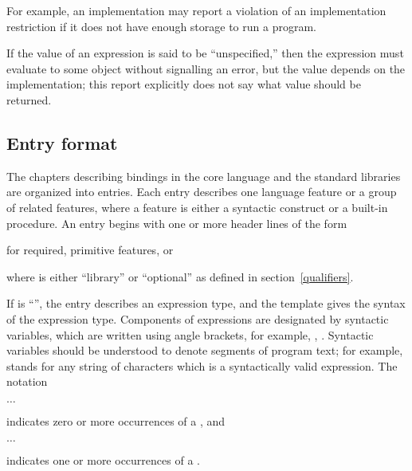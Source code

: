 \vest For example, an implementation may report a violation of an
implementation restriction if it does not have enough storage to run a
program.

\vest If the value of an expression is said to be ``unspecified,'' then
the expression must evaluate to some object without signalling an error,
but the value depends on the implementation; this report explicitly does
not say what value should be returned. 




\subsection{Entry format}

The chapters describing bindings in the core language and the standard
libraries are organized
into entries.  Each entry describes one language feature or a group of
related features, where a feature is either a syntactic construct or a
built-in procedure.  An entry begins with one or more header lines of the form

\noindent{}\unpenalty

for required, primitive features, or

\noindent{}\unpenalty

where  is either ``library'' or ``optional'' as defined
 in section~\ref{qualifiers}.

If  is ``\exprtype'', the entry describes an expression
type, and the template gives the syntax of the expression type.
Components of expressions are designated by syntactic variables, which
are written using angle brackets, for example, ,
.  Syntactic variables should be understood to denote segments of
program text; for example,  stands for any string of
characters which is a syntactically valid expression.  The notation
\begin{tabbing}
\qquad {} $\ldots$
\end{tabbing}
indicates zero or more occurrences of a , and
\begin{tabbing}
\qquad {}  $\ldots$
\end{tabbing}
indicates one or more occurrences of a .

